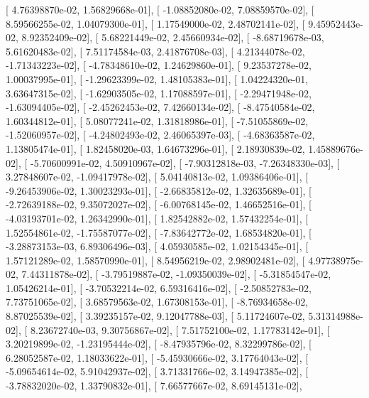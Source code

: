 \documentclass{article}
\begin{document}
       [  4.76398870e-02,   1.56829668e-01],
       [ -1.08852080e-02,   7.08859570e-02],
       [  8.59566255e-02,   1.04079300e-01],
       [  1.17549000e-02,   2.48702141e-02],
       [  9.45952443e-02,   8.92352409e-02],
       [  5.68221449e-02,   2.45660934e-02],
       [ -8.68719678e-03,   5.61620483e-02],
       [  7.51174584e-03,   2.41876708e-03],
       [  4.21344078e-02,  -1.71343223e-02],
       [ -4.78348610e-02,   1.24629860e-01],
       [  9.23537278e-02,   1.00037995e-01],
       [ -1.29623399e-02,   1.48105383e-01],
       [  1.04224320e-01,   3.63647315e-02],
       [ -1.62903505e-02,   1.17088597e-01],
       [ -2.29471948e-02,  -1.63094405e-02],
       [ -2.45262453e-02,   7.42660134e-02],
       [ -8.47540584e-02,   1.60344812e-01],
       [  5.08077241e-02,   1.31818986e-01],
       [ -7.51055869e-02,  -1.52060957e-02],
       [ -4.24802493e-02,   2.46065397e-03],
       [ -4.68363587e-02,   1.13805474e-01],
       [  1.82458020e-03,   1.64673296e-01],
       [  2.18930839e-02,   1.45889676e-02],
       [ -5.70600991e-02,   4.50910967e-02],
       [ -7.90312818e-03,  -7.26348330e-03],
       [  3.27848607e-02,  -1.09417978e-02],
       [  5.04140813e-02,   1.09386406e-01],
       [ -9.26453906e-02,   1.30023293e-01],
       [ -2.66835812e-02,   1.32635689e-01],
       [ -2.72639188e-02,   9.35072027e-02],
       [ -6.00768145e-02,   1.46652516e-01],
       [ -4.03193701e-02,   1.26342990e-01],
       [  1.82542882e-02,   1.57432254e-01],
       [  1.52554861e-02,  -1.75587077e-02],
       [ -7.83642772e-02,   1.68534820e-01],
       [ -3.28873153e-03,   6.89306496e-03],
       [  4.05930585e-02,   1.02154345e-01],
       [  1.57121289e-02,   1.58570990e-01],
       [  8.54956219e-02,   2.98902481e-02],
       [  4.97738975e-02,   7.44311878e-02],
       [ -3.79519887e-02,  -1.09350039e-02],
       [ -5.31854547e-02,   1.05426214e-01],
       [ -3.70532214e-02,   6.59316416e-02],
       [ -2.50852783e-02,   7.73751065e-02],
       [  3.68579563e-02,   1.67308153e-01],
       [ -8.76934658e-02,   8.87025539e-02],
       [  3.39235157e-02,   9.12047788e-03],
       [  5.11724607e-02,   5.31314988e-02],
       [  8.23672740e-03,   9.30756867e-02],
       [  7.51752100e-02,   1.17783142e-01],
       [  3.20219899e-02,  -1.23195444e-02],
       [ -8.47935796e-02,   8.32299786e-02],
       [  6.28052587e-02,   1.18033622e-01],
       [ -5.45930666e-02,   3.17764043e-02],
       [ -5.09654614e-02,   5.91042937e-02],
       [  3.71331766e-02,   3.14947385e-02],
       [ -3.78832020e-02,   1.33790832e-01],
       [  7.66577667e-02,   8.69145131e-02],
\end{document}
